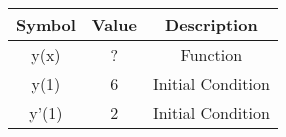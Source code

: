 \begin{tabular}{|c|c|c|}
    \hline
    Symbol & Value & Description \\
    \hline
    y(x) & ? & Function\\
    \hline
    y(1) & 6 & Initial Condition \\
    \hline 
    y'(1) & 2 & Initial Condition \\
    \hline 
\end{tabular}